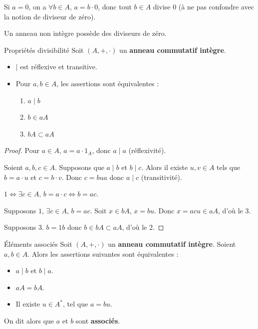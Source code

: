 \begin{remarque}
    Si $a = 0$, on a $\forall b \in A, \, a = b \cdot 0$, donc tout 
    $b \in A$ divise $0$ (à ne pas confondre avec la notion de diviseur de zéro).
\end{remarque}

\begin{remarque}
    Un anneau non intègre possède des diviseurs de zéro.
\end{remarque}

\begin{proposition}{Propriétés divisibilité}{}
    Soit $(A, +, \cdot)$ un \textbf{anneau commutatif intègre}. 

    \begin{itemize}
        \item $\mid$ est réflexive et transitive.
        \item Pour $a, b \in A$, les assertions sont équivalentes : 
        \begin{enumerate}
            \item $a \mid b$ 
            \item $b \in aA$
            \item $bA \subset aA$
        \end{enumerate}
    \end{itemize}
\end{proposition}

\begin{proof}
    Pour $a \in A$, $a = a \cdot 1_A$, donc $a \mid a$ (réflexivité).

    Soient $a, b, c \in A$. Supposons que $a \mid b$ et $b \mid c$.
    Alors il existe $u, v \in A$ tels que $b = a \cdot u$ et $c = b \cdot v$.
    Donc $c = bua$ donc $a \mid c$ (transitivité).

    \avspace $1 \iff \exists c \in A, \, b = a \cdot c \iff b = ac$.

    Supposons $1$, $\exists c \in A, \, b = ac$. Soit $x \in bA$, $x = bu$. Donc $x = acu \in aA$,
    d'où le 3.

    Supposons 3. $b = 1b$ donc $b \in bA \subset aA$, d'où le 2.
\end{proof}

    
\begin{theoreme}{Éléments associés}{}
    Soit $(A, +, \cdot)$ un \textbf{anneau commutatif intègre}. 
    Soient $a, b \in A$. Alors les assertions suivantes sont équivalentes : 
    \begin{itemize}
        \item $a \mid b$ et $b \mid a$.
        \item $aA = bA$.
        \item Il existe $u \in A^*$, tel que $a = bu$.
    \end{itemize}
    On dit alors que $a$ et $b$ sont \textbf{associés}.
\end{theoreme}

